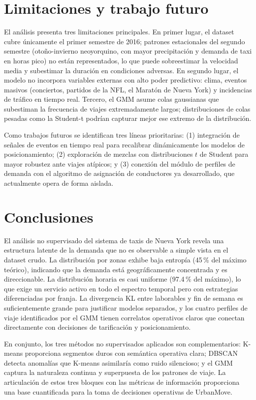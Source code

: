 \documentclass[12pt, a4paper]{article}
\begin{document}
\section{Limitaciones y trabajo futuro}

El análisis presenta tres limitaciones principales. En primer lugar, el dataset cubre únicamente el primer semestre de 2016; patrones estacionales del segundo semestre (otoño-invierno neoyorquino, con mayor precipitación y demanda de taxi en horas pico) no están representados, lo que puede sobreestimar la velocidad media y subestimar la duración en condiciones adversas. En segundo lugar, el modelo no incorpora variables externas con alto poder predictivo: clima, eventos masivos (conciertos, partidos de la NFL, el Maratón de Nueva York) y incidencias de tráfico en tiempo real. Tercero, el GMM asume colas gaussianas que subestiman la frecuencia de viajes extremadamente largos; distribuciones de colas pesadas como la Student-t podrían capturar mejor ese extremo de la distribución.

Como trabajos futuros se identifican tres líneas prioritarias: (1) integración de señales de eventos en tiempo real para recalibrar dinámicamente los modelos de posicionamiento; (2) exploración de mezclas con distribuciones $t$ de Student para mayor robustez ante viajes atípicos; y (3) conexión del módulo de perfiles de demanda con el algoritmo de asignación de conductores ya desarrollado, que actualmente opera de forma aislada.

\section{Conclusiones}

El análisis no supervisado del sistema de taxis de Nueva York revela una estructura latente de la demanda que no es observable a simple vista en el dataset crudo. La distribución por zonas exhibe baja entropía (45\,\% del máximo teórico), indicando que la demanda está geográficamente concentrada y es direccionable. La distribución horaria es casi uniforme (97{.}4\,\% del máximo), lo que exige un servicio activo en todo el espectro temporal pero con estrategias diferenciadas por franja. La divergencia KL entre laborables y fin de semana es suficientemente grande para justificar modelos separados, y los cuatro perfiles de viaje identificados por el GMM tienen correlatos operativos claros que conectan directamente con decisiones de tarificación y posicionamiento.

En conjunto, los tres métodos no supervisados aplicados son complementarios: K-means proporciona segmentos duros con semántica operativa clara; DBSCAN detecta anomalías que K-means asimilaría como ruido silencioso; y el GMM captura la naturaleza continua y superpuesta de los patrones de viaje. La articulación de estos tres bloques con las métricas de información proporciona una base cuantificada para la toma de decisiones operativas de UrbanMove.

\end{document}
